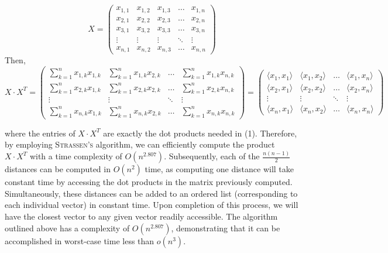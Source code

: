 \documentclass[12pt]{article}
\theoremstyle{definition}
\theoremstyle{remark}
\begin{document}
\begin{enumerate}
  $$ X = \begin{pmatrix}
    x_{1,1} & x_{1,2} & x_{1,3} & \hdots & x_{1,n} \\ 
 x_{2,1} & x_{2,2} & x_{2,3} & \hdots & x_{2,n} \\
 x_{3,1} & x_{3,2} & x_{3,3} & \hdots & x_{3,n}\\ 
    \vdots & \vdots & \vdots & \ddots & \vdots \\ 
     x_{n,1} & x_{n,2} & x_{n,3} & \hdots & x_{n,n}
  \end{pmatrix} $$
  Then, 
  $$X \cdot X^T = \begin{pmatrix}
    \sum_{k = 1}^n x_{1,k}x_{1,k} & \sum_{k = 1}^n x_{1,k}x_{2,k} & \hdots  & \sum_{k = 1}^n x_{1,k}x_{n,k} \\ 
    \sum_{k = 1}^n x_{2,k}x_{1,k} & \sum_{k = 1}^n x_{2,k}x_{2,k} & \hdots  & \sum_{k = 1}^n x_{2,k}x_{n,k} \\ 
\vdots & \vdots & \ddots & \vdots \\ 
    \sum_{k = 1}^n x_{n,k}x_{1,k} & \sum_{k = 1}^n x_{n,k}x_{2,k} & \hdots  & \sum_{k = 1}^n x_{n,k}x_{n,k}
  \end{pmatrix} = \begin{pmatrix}
    \langle x_1, x_1  \rangle &\langle x_1, x_2  \rangle & \hdots & \langle x_1, x_n  \rangle \\ 
\langle x_2, x_1  \rangle &\langle x_2, x_2  \rangle & \hdots & \langle x_2, x_n  \rangle \\ 
\vdots & \vdots & \ddots & \vdots \\ 

\langle x_n, x_1  \rangle &\langle x_n, x_2  \rangle & \hdots & \langle x_n, x_n  \rangle  

  \end{pmatrix}  $$

where the entries of $X \cdot {X^T}$ are exactly the dot products needed in (1). 
Therefore, by employing \textsc{Strassen's} algorithm, we can efficiently compute the product $X \cdot {X^T}$ with a time complexity of $O(n^{2.807})$. Subsequently, each of the $\frac{n(n-1)}{2} $ distances can be computed in $O(n^2)$ time, as computing one distance will take constant time by accessing the dot products in the matrix previously computed. Simultaneously, these distances can be added to an ordered list (corresponding to each individual vector) in constant time. Upon completion of this process, we will have the closest vector to any given vector readily accessible. The algorithm outlined above has a complexity of $O(n^{2.807})$, demonstrating that it can be accomplished in worst-case time less than $o(n^3)$.


\end{enumerate}
\end{document}
